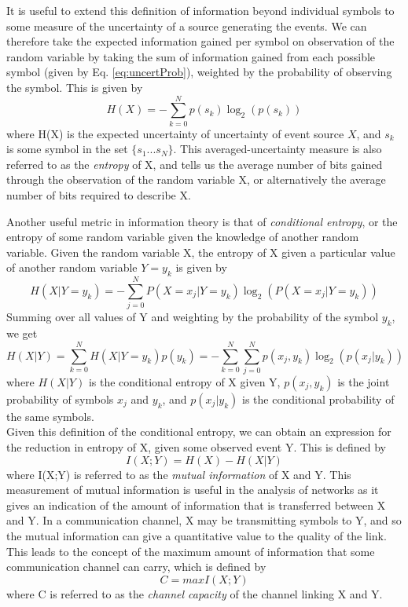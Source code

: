 It is useful to extend this definition of information beyond individual symbols to some measure of the uncertainty of a source generating the events. We can therefore take the expected information gained per symbol on observation of the random variable by taking the sum of information gained from each possible symbol (given by Eq. \ref{eq:uncertProb}), weighted by the probability of observing the symbol. This is given by
\begin{equation}
    \label{eq:entropyDiscr}
    H(X) = -\sum_{k=0}^{N}p(s_{k})\log_{2}(p(s_{k}))
\end{equation}
where H(X) is the expected uncertainty of uncertainty of event source $X$, and $s_{k}$ is some symbol in the set $\{s_{1}...s_{N}\}$. This averaged-uncertainty measure is also referred to as the \emph{entropy} of X, and tells us the average number of bits gained through the observation of the random variable X, or alternatively the average number of bits required to describe X.
\par
Another useful metric in information theory is that of \emph{conditional entropy}, or the entropy of some random variable given the knowledge of another random variable. Given the random variable X, the entropy of X given a particular value of another random variable $Y=y_{k}$ is given by
\begin{equation}
    \label{eq:condEntSing}
    H(X|Y=y_{k}) = -\sum_{j=0}^{N}P(X=x_{j}|Y=y_{k})\log_{2}(P(X=x_{j}|Y=y_{k}))
\end{equation}
Summing over all values of Y and weighting by the probability of the symbol $y_{k}$, we get
\begin{equation}
    \label{eq:condEnt}
    H(X|Y) = \sum_{k=0}^{N}H(X|Y=y_{k})p(y_{k}) = -\sum_{k=0}^{N}\sum_{j=0}^{N}p(x_{j},y_{k})\log_{2}(p(x_{j}|y_{k}))
\end{equation}
where $H(X|Y)$ is the conditional entropy of X given Y, $p(x_{j},y_{k})$ is the joint probability of symbols $x_{j}$ and $y_{k}$, and $p(x_{j}|y_{k})$ is the conditional probability of the same symbols.\\
Given this definition of the conditional entropy, we can obtain an expression for the reduction in entropy of X, given some observed event Y. This is defined by
\begin{equation}
    \label{eq:mutualInf}
    I(X;Y) = H(X) - H(X|Y)
\end{equation}
where I(X;Y) is referred to as the \emph{mutual information} of X and Y. This measurement of mutual information is useful in the analysis of networks as it gives an indication of the amount of information that is transferred between X and Y. In a communication channel, X may be transmitting symbols to Y, and so the mutual information can give a quantitative value to the quality of the link. This leads to the concept of the maximum amount of information that some communication channel can carry, which is defined by
\begin{equation}
    \label{eq:chanCap}
    C = max I(X;Y)
\end{equation}
where C is referred to as the \emph{channel capacity} of the channel linking X and Y.

